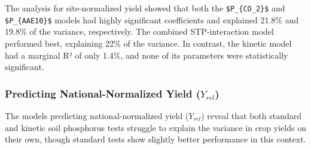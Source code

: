 \documentclass[
  a4paper,
]{article}
\begin{document}
The analysis for site-normalized yield showed that both the
\texttt{\$P\_\{CO\_2\}\$} and \texttt{\$P\_\{AAE10\}\$} models had
highly significant coefficients and explained 21.8\% and 19.8\% of the
variance, respectively. The combined STP-interaction model performed
best, explaining 22\% of the variance. In contrast, the kinetic model
had a marginal R² of only 1.4\%, and none of its parameters were
statistically significant.

\subsubsection{\texorpdfstring{Predicting National-Normalized Yield
(\(Y_{rel}\))}{Predicting National-Normalized Yield (Y\_\{rel\})}}\label{predicting-national-normalized-yield-y_rel}

The models predicting national-normalized yield (\(Y_{rel}\)) reveal
that both standard and kinetic soil phosphorus tests struggle to explain
the variance in crop yields on their own, though standard tests show
slightly better performance in this context.
\end{document}
